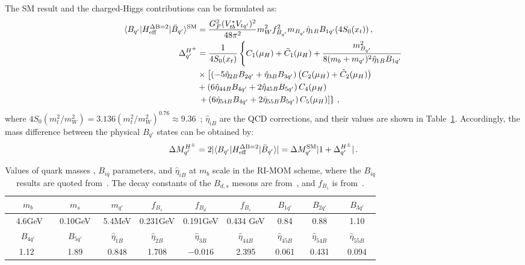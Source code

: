 \documentclass[prd,preprint,superscriptaddress,amsmath,amssymb]{revtex4}
\begin{document}
The SM result and the charged-Higgs contributions can be formulated as:
 \begin{align}
\langle B_{q'}| H^{\rm \Delta B=2}_{\rm eff} | \bar B_{q'} \rangle ^{\rm SM} & = \frac{G^2_F (V^*_{tb} V_{tq'})^2 }{48\pi^2} m^2_W f^2_{B_{q'}}  m_{B_{q'}} \hat{\eta}_{1B} B_{1q'} ( 4S_0(x_t) )\,, \nonumber \\
%
 \Delta^{H^\pm}_{q'}  & = \frac{1}{4 S_0(x_t)}   \left\{ C_1 (\mu_H)+ \tilde{C}_1(\mu_H) +  \frac{ m^2_{B_{q'}}   }{8 (m_b + m_{q'})^2 \hat{\eta}_{1B} B_{1q'} }  \right. \nonumber \\
 & \times \left[ \left( -5 \hat{\eta}_{2B} B_{2q'} + \hat{\eta}_{3B} B_{3q'} \right) \left( C_2(\mu_H) +  \tilde{C}_2(\mu_H)  \right)  \right. \nonumber \\
 & + \left( 6 \hat\eta_{44B} B_{4q'} + 2 \hat\eta_{45B} B_{5q'}\right) C_4(\mu_H)  \nonumber \\
 & \left. \left.    + \left( 6 \hat\eta_{54B} B_{4q'} + 2\hat\eta_{55B} B_{5q'}\right) C_5(\mu_H)  \right]
 \right\}\,, 
  \end{align}
where $4 S_0(m^2_t/m^2_W)=3.136 (m^2_t/m^2_W)^{0.76} \approx 9.36$~\cite{Buchalla:1995vs}; $\hat{\eta}_{iB}$ are the QCD corrections, and their values are shown in Table~\ref{tab:BPs}. Accordingly, the mass difference between the physical $B_{q'}$ states can be obtained by:
 \begin{equation}
 \Delta M^{H^\pm}_{q'} = 2 | \langle B_{q'}| H^{\rm \Delta B=2}_{\rm eff} | \bar B_{q'} \rangle|=\Delta M^{\rm SM}_{q'} |1+\Delta^{H^\pm}_{q'}|\,. 
 \label{eq:DMq}
 \end{equation}
 
 \begin{table}[htp]
\caption{Values of quark masses , $B_{iq}$ parameters, and $\hat\eta_{iB}$  at $m_b$ scale in the RI-MOM scheme,  where  the  $B_{iq}$ results are quoted from~\cite{Carrasco:2013zta}. The decay constants of the $B_{d,s}$ mesons are from~\cite{Lenz:2010gu}, and $f_{B_c}$ is from~\cite{Colquhoun:2015oha}.}
\begin{tabular}{ccccccccc}  \hline \hline
 $m_b$ & $m_s$ & $m_{q'}$ & $f_{B_s}$ & $f_{B_d}$ & $f_{B_c}$ & $B_{1q'}$ & $B_{2q'}$ & $B_{3q'} $   \\ \hline 
 ~ 4.6GeV~& ~0.10GeV~ & 5.4MeV & 0.231GeV &  0.191GeV  & 0.434 GeV & ~0.84~ & ~ 0.88 ~ & ~ 1.10 ~ \\ \hline
  $B_{4q'}$ & $B_{5q'}$  & $\hat\eta_{1B}$  & $\hat\eta_{2B}$ & $\hat\eta_{3B}$  & $\hat\eta_{44B}$ & $\hat\eta_{45B}$ & $\hat\eta_{54B}$ & $\hat\eta_{55B}$\\ \hline
 ~1.12 ~& ~1.89~& 0.848 & 1.708 & $-0.016$ & 2.395 & 0.061  & 0.431  & 0.094 \\ \hline \hline 
  
  \end{tabular}
\label{tab:BPs}
\end{table}%
\end{document}
